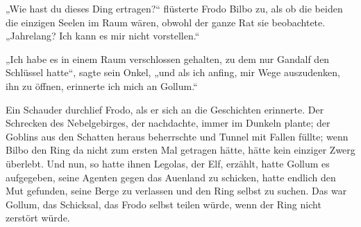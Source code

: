 „Wie hast du dieses Ding ertragen?“ flüsterte Frodo Bilbo zu, als ob die beiden die einzigen Seelen im Raum wären, obwohl der ganze Rat sie beobachtete.
„Jahrelang? Ich kann es mir nicht vorstellen.“

„Ich habe es in einem Raum verschlossen gehalten, zu dem nur Gandalf den Schlüssel hatte“, sagte sein Onkel, „und als ich anfing, mir Wege auszudenken, ihn zu öffnen, erinnerte ich mich an Gollum.“

Ein Schauder durchlief Frodo, als er sich an die Geschichten erinnerte. Der Schrecken des Nebelgebirges, der nachdachte, immer im Dunkeln plante; der Goblins aus den Schatten heraus beherrschte und Tunnel mit Fallen füllte; wenn Bilbo den Ring da nicht zum ersten Mal getragen hätte, hätte kein einziger Zwerg überlebt. Und nun, so hatte ihnen Legolas, der Elf, erzählt, hatte Gollum es aufgegeben, seine Agenten gegen das Auenland zu schicken, hatte endlich den Mut gefunden, seine Berge zu verlassen und den Ring selbst zu suchen. Das war Gollum, das Schicksal, das Frodo selbst teilen würde, wenn der Ring nicht zerstört würde.

